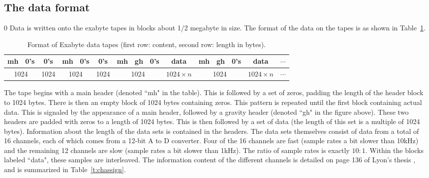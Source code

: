 \subsection{The data format}
\setcounter{equation}0
Data is written onto the exabyte tapes in blocks about 1/2 megabyte in
size.  The format of the data on the tapes is as shown in
Table~\ref{t:datatape}.
\begin{table}[h]
\begin{tabular}[]{|c|c|c|c|c|c|c|c|c|c|c|c|c|c|c}
\hline
mh & 0's & 0's & mh & 0's & 0's &  mh &gh & 0's & data & mh &gh & 0's & data & $\cdots$ \\
\hline
\multicolumn{2}{|c|}{1024} & 1024 &  \multicolumn{2}{|c|}{1024}  & 1024 & \multicolumn{3}{|c|}{1024} &  $1024 \times n$ & 
 \multicolumn{3}{|c|}{1024} &  $1024 \times n$& $\cdots$\\
\hline
\end{tabular}
\caption{Format of Exabyte data tapes (first row: content, second row: length in bytes).}
\label{t:datatape}
\end{table}
The tape begins with a main header (denoted ``mh" in the table).  This
is followed by a set of zeros, padding the length of the header block
to 1024 bytes.  There is then an empty block of 1024 bytes containing
zeros.  This pattern is repeated until the first block containing
actual data.  This is signaled by the appearance of a main header,
followed by a gravity header (denoted ``gh" in the figure above).
These two headers are padded with zeros to a length of 1024 bytes.
This is then followed by a set of data (the length of this set is a
multiple of 1024 bytes).  Information about the length of the data sets
is contained in the headers.  The data sets themselves consist of data
from a total of 16 channels, each of which comes from a 12-bit A to D
converter.  Four of the 16 channels are fast (sample rates a bit slower
than 10kHz) and the remaining 12 channels are slow (sample rates a bit
slower than 1kHz).  The ratio of sample rates is exactly $10:1$.
Within the blocks labeled ``data", these samples are interleaved.  The
information content of the different channels is detailed on page 136
of Lyon's thesis \cite{Lyons}, and is summarized in Table~\ref{t:chassign}.

